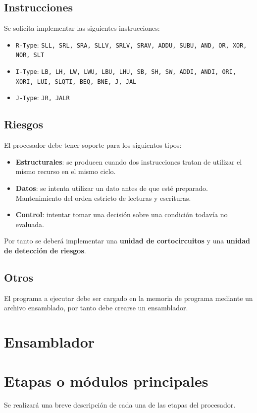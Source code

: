\documentclass[a4paper]{article}
\begin{document}
\subsection{Instrucciones}
Se solicita implementar las siguientes instrucciones:
\begin{itemize}
	\item \texttt{R-Type}: \texttt{SLL, SRL, SRA, SLLV, SRLV, SRAV, ADDU, SUBU, AND, OR, XOR, NOR, SLT}
	\item \texttt{I-Type}: \texttt{LB, LH, LW, LWU, LBU, LHU, SB, SH, SW, ADDI, ANDI, ORI, XORI, LUI, SLQTI, BEQ, BNE, J, JAL}
	\item \texttt{J-Type}: \texttt{JR, JALR}
\end{itemize}

\subsection{Riesgos}
El procesador debe tener soporte para los siguientos tipos:
\begin{itemize}
	\item \textbf{Estructurales}: se producen cuando dos instrucciones tratan de utilizar el mismo recurso en el mismo ciclo.
	\item \textbf{Datos}: se intenta utilizar un dato antes de que esté preparado. Mantenimiento del orden estricto de lecturas y escrituras.
	\item \textbf{Control}: intentar tomar una decisión sobre una condición todavía no evaluada.
\end{itemize}

Por tanto se deberá implementar una \textbf{unidad de cortocircuitos} y una \textbf{unidad de detección de riesgos}.

\subsection{Otros}
El programa a ejecutar debe ser cargado en la memoria de programa mediante un archivo ensamblado, por tanto debe crearse un ensamblador.

\section{Ensamblador}

\section{Etapas o módulos principales}
Se realizará una breve descripción de cada una de las etapas del procesador.
\end{document}
